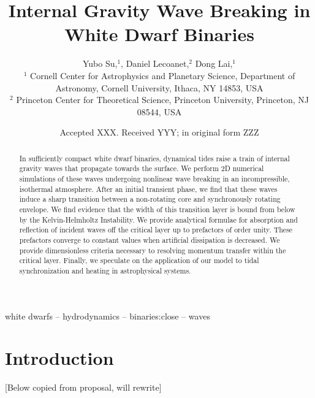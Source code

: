 \documentclass[
        fleqn,
        usenatbib,
    ]{mnras}
\title[Internal Gravity Wave Breaking in White Dwarf Binaries]{Internal Gravity
Wave Breaking in White Dwarf Binaries}
\author[Y. Su et\ al.]{
Yubo Su,$^1$,
Daniel Lecoanet,$^2$
Dong Lai,$^1$
\\
$^1$ Cornell Center for Astrophysics and Planetary Science, Department of
Astronomy, Cornell University, Ithaca, NY 14853, USA
\\
$^2$ Princeton Center for Theoretical Science, Princeton University, Princeton,
NJ 08544, USA
}
\date{Accepted XXX\@. Received YYY\@; in original form ZZZ}
\begin{document}
\label{firstpage}
\pagerange{\pageref{firstpage}--\pageref{lastpage}}
\renewcommand*{\sectionautorefname}{Section}
\maketitle


\begin{abstract}
    In sufficiently compact white dwarf binaries, dynamical tides raise a train
    of internal gravity waves that propagate towards the surface. We perform 2D
    numerical simulations of these waves undergoing nonlinear wave breaking in
    an incompressible, isothermal atmosphere. After an initial transient phase,
    we find that these waves induce a sharp transition between a non-rotating
    core and synchronously rotating envelope. We find evidence that the width of
    this transition layer is bound from below by the Kelvin-Helmholtz
    Instability. We provide analytical formulae for absorption and reflection of
    incident waves off the critical layer up to prefactors of order unity. These
    prefactors converge to constant values when artificial dissipation is
    decreased. We provide dimensionless criteria necessary to resolving momentum
    transfer within the critical layer. Finally, we speculate on the application
    of our model to tidal synchronization and heating in astrophysical systems.
\end{abstract}

\begin{keywords}
white dwarfs -- hydrodynamics -- binaries:close -- waves %
\end{keywords}

\section{Introduction}

[Below copied from proposal, will rewrite]
\end{document}
